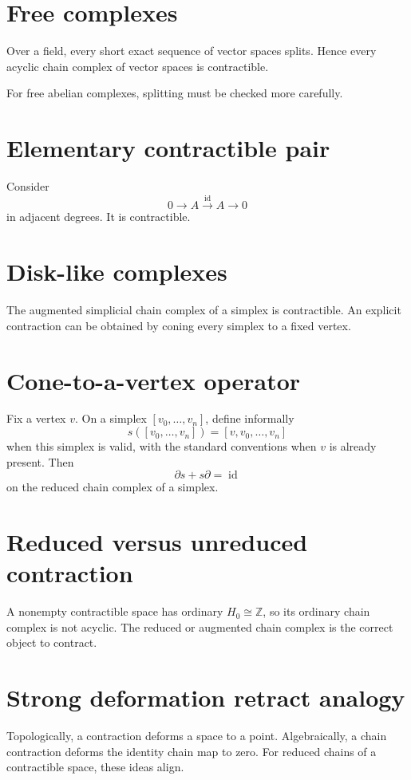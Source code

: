 \section{Free complexes}
Over a field, every short exact sequence of vector spaces splits.  Hence every
acyclic chain complex of vector spaces is contractible.

For free abelian complexes, splitting must be checked more carefully.

\section{Elementary contractible pair}
Consider
\[
0\to A\xrightarrow{\operatorname{id}}A\to0
\]
in adjacent degrees.  It is contractible.

\section{Disk-like complexes}
The augmented simplicial chain complex of a simplex is contractible.  An
explicit contraction can be obtained by coning every simplex to a fixed vertex.

\section{Cone-to-a-vertex operator}
Fix a vertex \(v\).  On a simplex \([v_0,\dots,v_n]\), define informally
\[
s([v_0,\dots,v_n])=[v,v_0,\dots,v_n]
\]
when this simplex is valid, with the standard conventions when \(v\) is already
present.  Then
\[
\partial s+s\partial=\operatorname{id}
\]
on the reduced chain complex of a simplex.

\section{Reduced versus unreduced contraction}
A nonempty contractible space has ordinary \(H_0\cong\mathbb Z\), so its
ordinary chain complex is not acyclic.  The reduced or augmented chain complex
is the correct object to contract.

\section{Strong deformation retract analogy}
Topologically, a contraction deforms a space to a point.  Algebraically, a
chain contraction deforms the identity chain map to zero.  For reduced chains
of a contractible space, these ideas align.

